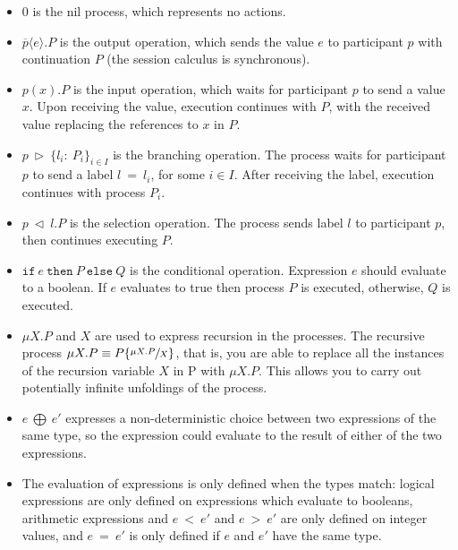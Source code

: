 \documentclass[12pt,twoside]{report}
\begin{document}
\begin{itemize}
    \item $0$ is the nil process, which represents no actions.
    \item $\overline{p} \langle e \rangle.P$ is the output operation, which sends the value $e$ to participant $p$ with continuation $P$ (the session calculus is synchronous).
    \item $p(x).P$ is the input operation, which waits for participant $p$ to send a value $x$. Upon receiving the value, execution continues with $P$, with the received value replacing the references to $x$ in $P$.
    
    \item $p\ \triangleright\ \{l_i:\ P_i\}_{i\in I}$ is the branching operation. The process waits for participant $p$ to send a label $l\ =\ l_i$, for some $i \in I$. After receiving the label, execution continues with process $P_i$.
    
    \item $p\ \triangleleft\ l.P$ is the selection operation. The process sends label $l$ to participant $p$, then continues executing $P$.
    
    \item $\texttt{if}\ e\ \texttt{then}\ P\ \texttt{else}\ Q$ is the conditional operation. Expression $e$ should evaluate to a boolean. If $e$ evaluates to true then process $P$ is executed, otherwise, $Q$ is executed.
    
    \item $\mu X.P$ and $X$ are used to express recursion in the processes. The recursive process $\mu X.P \equiv P\{\sfrac{\mu X.P}{X}\}$, that is, you are able to replace all the instances of the recursion variable $X$ in P with $\mu X.P$. This allows you to carry out potentially infinite unfoldings of the process.
    
    \item $e\ \bigoplus\ e'$ expresses a non-deterministic choice between two expressions of the same type, so the expression could evaluate to the result of either of the two expressions. 
    
    \item The evaluation of expressions is only defined when the types match: logical expressions are only defined on expressions which evaluate to booleans, arithmetic expressions and $e\ <\ e'$ and $e\ >\ e'$ are only defined on integer values, and $e\ =\ e'$ is only defined if $e$ and $e'$ have the same type.
\end{itemize}{}
\end{document}
